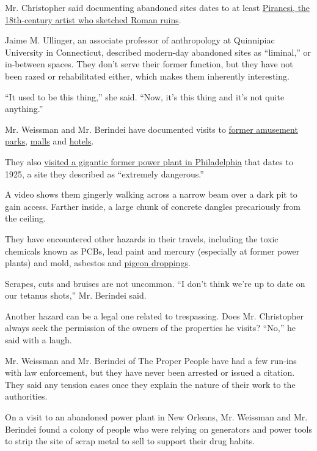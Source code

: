 Mr. Christopher said documenting abandoned sites dates to at least
\href{https://www.nytimes.com/2007/09/28/arts/design/28pira.html}{Piranesi,
the 18th-century artist who sketched Roman ruins}.

Jaime M. Ullinger, an associate professor of anthropology at Quinnipiac
University in Connecticut, described modern-day abandoned sites as
``liminal,'' or in-between spaces. They don't serve their former
function, but they have not been razed or rehabilitated either, which
makes them inherently interesting.

``It used to be this thing,'' she said. ``Now, it's this thing and it's
not quite anything.''

Mr. Weissman and Mr. Berindei have documented visits to
\href{https://www.youtube.com/watch?v=XTPOkrJLWPM}{former amusement
parks}, \href{https://www.youtube.com/watch?v=QmNyVFibClQ}{malls} and
\href{https://www.youtube.com/watch?v=OUQz62-Ny1g}{hotels}.

They also \href{https://www.youtube.com/watch?v=oz5BamDwRDg}{visited a
gigantic former power plant in Philadelphia} that dates to 1925, a site
they described as ``extremely dangerous.''

A video shows them gingerly walking across a narrow beam over a dark pit
to gain access. Farther inside, a large chunk of concrete dangles
precariously from the ceiling.

They have encountered other hazards in their travels, including the
toxic chemicals known as PCBs, lead paint and mercury (especially at
former power plants) and mold, asbestos and
\href{https://www1.nyc.gov/site/doh/health/health-topics/pigeon.page}{pigeon
droppings}.

Scrapes, cuts and bruises are not uncommon. ``I don't think we're up to
date on our tetanus shots,'' Mr. Berindei said.

Another hazard can be a legal one related to trespassing. Does Mr.
Christopher always seek the permission of the owners of the properties
he visits? ``No,'' he said with a laugh.

Mr. Weissman and Mr. Berindei of The Proper People have had a few
run-ins with law enforcement, but they have never been arrested or
issued a citation. They said any tension eases once they explain the
nature of their work to the authorities.

On a visit to an abandoned power plant in New Orleans, Mr. Weissman and
Mr. Berindei found a colony of people who were relying on generators and
power tools to strip the site of scrap metal to sell to support their
drug habits.

